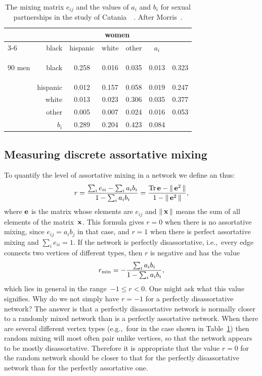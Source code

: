 \documentclass[twocolumn,pre]{revtex4}
\begin{document}
\begin{table}[t]
\begin{tabular}{l|r|cccc|c}
\multicolumn{2}{c|}{} & \multicolumn{4}{c|}{women}               \\
\cline{3-6}
\multicolumn{2}{c|}{} & black & hispanic & white & other & $a_i$ \\
\hline
\begin{rotate}{90}
\hbox{\hspace{-21pt}men}
\end{rotate}
& black    & 0.258 & 0.016 & 0.035 & 0.013 & 0.323 \\
& hispanic & 0.012 & 0.157 & 0.058 & 0.019 & 0.247 \\
& white    & 0.013 & 0.023 & 0.306 & 0.035 & 0.377 \\
& other    & 0.005 & 0.007 & 0.024 & 0.016 & 0.053 \\
\hline
\multicolumn{2}{r|}{$b_i$} 
           & 0.289 & 0.204 & 0.423 & 0.084 \\
\end{tabular}
\caption{The mixing matrix $e_{ij}$ and the values of $a_i$ and $b_i$ for
sexual partnerships in the study of Catania~\etal~\cite{CCKF92}.  After Morris~\cite{Morris95}.}
\label{sanfran}
\end{table}


\subsection{Measuring discrete assortative mixing}
\label{discmeas}
To quantify the level of assortative mixing in a network we define an
 thus:
\begin{equation}
r = {\sum_i e_{ii} - \sum_i a_i b_i\over 1 - \sum_i a_i b_i}
  = {\mathop{\rm Tr}\mathbf{e} - \|\,\mathbf{e}^2\,\|\over 1 - \|\,\mathbf{e}^2\,\|},
\label{defsr1}
\end{equation}
where $\mathbf{e}$ is the matrix whose elements are $e_{ij}$ and $\|\,\mathbf{x}\,\|$
means the sum of all elements of the matrix~$\mathbf{x}$.  This formula gives
$r=0$ when there is no assortative mixing, since $e_{ij}=a_ib_j$ in that
case, and $r=1$ when there is perfect assortative mixing and $\sum_i
e_{ii}=1$.  If the network is perfectly disassortative, i.e.,~every edge
connects two vertices of different types, then $r$ is negative and has the
value
\begin{equation}
r_{\rm min} = - {\sum_i a_i b_i\over 1 - \sum_i a_i b_i},
\label{defsrmin}
\end{equation}
which lies in general in the range~$-1\le r<0$.  One might ask what this
value signifies.  Why do we not simply have $r=-1$ for a perfectly
disassortative network?  The answer is that a perfectly disassortative
network is normally closer to a randomly mixed network than is a perfectly
assortative network.  When there are several different vertex types
(e.g.,~four in the case shown in Table~\ref{sanfran}) then random mixing will
most often pair unlike vertices, so that the network appears to be mostly
disassortative.  Therefore it is appropriate that the value $r=0$ for the
random network should be closer to that for the perfectly disassortative
network than for the perfectly assortative one.
\end{document}
